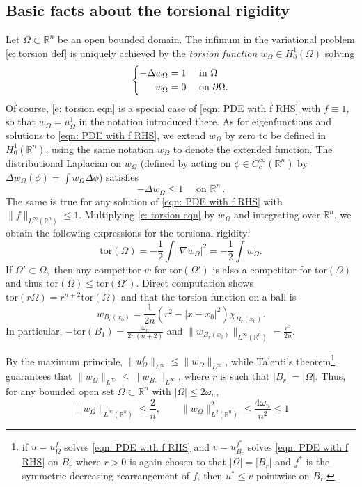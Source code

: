 \documentclass[10pt,a4paper]{amsart}
\numberwithin{equation}{section}
\def\R{{\mathbb R}}
\def\W{\Omega}
\def\om{\omega}
\def\tor{\mathrm{tor}}
\def\na{\nabla}
\begin{document}
\subsection{Basic facts about the torsional rigidity}
Let $\W\subset \R^n$ be an open bounded domain. The infimum in the variational problem \eqref{e: torsion def} is uniquely achieved by the {\it torsion function} $w_\W \in H^1_0(\W)$ solving
\begin{equation}
	\label{e: torsion eqn}
\begin{cases}
\hfill	-\Delta w_\W = 1 & \text{ in }\W\\
\hfill	w_\W = 0 & \text{ on } \partial \W.
\end{cases}
\end{equation}
Of course, \eqref{e: torsion eqn} is a special case of  \eqref{eqn: PDE with f RHS} with $f \equiv 1$, so that $w_\W = u_\W^1 $ in the notation introduced there. As for eigenfunctions and solutions to \eqref{eqn: PDE with f RHS}, we extend $w_\W$ by zero to be defined in $H^1_0(\R^n)$, using the same notation $w_\W$ to denote the extended function. The distributional Laplacian on $w_\W$ (defined by acting on $\phi \in C^\infty_c(\R^n)$ by $\Delta w_\W(\phi) = \int w_\W \Delta \phi$) satisfies
\begin{equation*}
    -\Delta w_\W \leq 1 \quad\text{ on } \R^n\, .
\end{equation*}
The same is true for any solution of \eqref{eqn: PDE with f RHS} with $\| f\|_{L^\infty(\R^n)}\leq 1.$
Multiplying \eqref{e: torsion eqn} by $w_\W$ and integrating over $\R^n$, we obtain the following expressions for the torsional rigidity:
\begin{equation}\label{e: torsion and dir energy}
\tor(\W) = -\frac{1}{2} \int |\na w_\W|^2 = -\frac{1}{2} \int w_\W.
\end{equation}
If $\W'\subset \W,$ then any competitor $w $ for $\tor(\W')$ is also a competitor for $\tor (\W)$ and thus $\tor(\W) \leq \tor(\W')$. Direct computation shows $\tor\left(r \W \right) = r^{n+2} \tor (\Omega)$ and that 
the torsion function on a ball is 
\begin{equation}
 	\label{eqn: tor function on a ball}
 w_{B_r(x_0)} = \frac{1}{2n}(r^2 - |x-x_0|^2 ) \chi_{B_r(x_0)}. 
  \end{equation}
In particular, $-\tor(B_1)  = \frac{\omega_n}{2n(n+2)}$ and $\| w_{B_r(x_0)}\|_{L^\infty(\R^n)} =\frac{r^2}{2n}$.

By the maximum principle, $\| u_\W^f\|_{L^\infty}  \leq \| w_\W\|_{L^\infty}$, while
 Talenti's theorem\footnote{if $u=u_\W^f$ solves \eqref{eqn: PDE with f RHS} 
and $v= u_{B_r}^{f^*}$ solves \eqref{eqn: PDE with f RHS} on $B_r$ 
 where $r>0$ is again chosen to that $|\W| = |B_r|$ and $f^*$ is the symmetric decreasing rearrangement of $f$, then $u^* \leq v$ pointwise on $B_r$. } \cite{Talenti1976} guarantees that $\| w_\W\|_{L^\infty} \leq \|w_{B_r}\|_{L^\infty}$, where $r$ is such that $|B_r|=|\W|$. 
Thus, for any bounded open set $\W \subset \R^n$ with $|\W| \leq 2 \omega_n$, 
\begin{equation}
    \label{eqn: bound for tor fn}
\| w_\W\|_{L^\infty(\R^n)} \leq \frac{2}{n}, \qquad \| w_\W\|_{L^2(\R^n)}^2 \leq \frac{4\om_n}{n^2} \leq 1
\end{equation}
\end{document}

